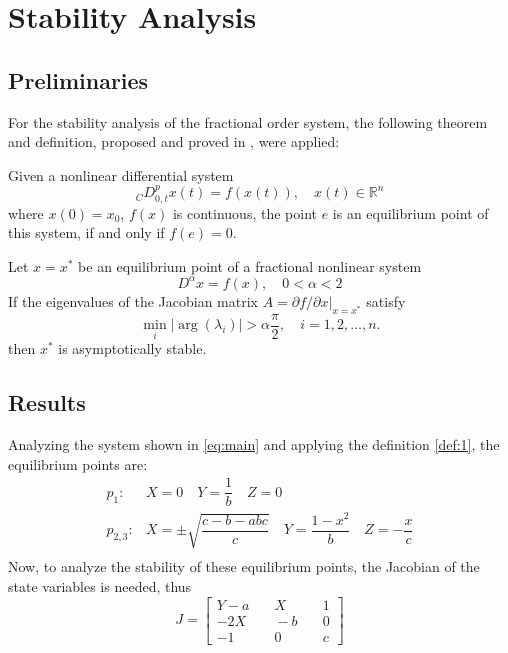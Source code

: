 \section{Stability Analysis}\label{stab}
\subsection{Preliminaries}
For the stability analysis of the fractional order system, the following theorem and definition, proposed and proved in \cite{abd2010chaos}, were applied:
\theoremstyle{definition}
\begin{definition}\label{def:1}
	Given a nonlinear differential system
    \begin{equation}
    	_CD_{0,t}^px(t)=f(x(t)),\quad x(t)\in\mathbb{R}^n
    \end{equation}
    where $x(0)=x_0$, $f(x)$ is continuous, the point $e$ is an equilibrium point of this system, if and only if $f(e)=0$.
\end{definition}
\begin{theorem}\label{theo:1}
Let $x=x^*$ be an equilibrium point of a fractional nonlinear system
\begin{equation}
D^\alpha x = f(x),\quad 0<\alpha<2
\end{equation}
If the eigenvalues of the Jacobian matrix $A = \partial f/\partial x|_{x=x^*}$ satisfy
\begin{equation}
 \min_{i}\left|\arg(\lambda_i)\right|>\alpha \frac{\pi}{2},\quad i=1,2,\dots,n.
\end{equation}
then $x^*$ is asymptotically stable.
\end{theorem}

\subsection{Results}
Analyzing the system shown in \ref{eq:main} and applying the definition \ref{def:1}, the equilibrium points are:
\begin{equation}
	\begin{array}{ll}
		p_1:&X=0\quad Y=\dfrac{1}{b}\quad Z=0\\
    	p_{2,3}:&X=\pm\sqrt{\dfrac{c-b-abc}{c}}\quad Y=\dfrac{1-x^2}{b}\quad Z=-\dfrac{x}{c}\\
	\end{array}
\end{equation}
Now, to analyze the stability of these equilibrium points, the Jacobian of the state variables is needed, thus
\begin{equation}
	J = \left[\begin{array}{ccc}
	Y-a &\quad X 	&\quad 1\\ 
    -2X 	&\quad -b 	&\quad 0\\
    -1 		&\quad 0 	&\quad c
	\end{array}\right]
\end{equation}

